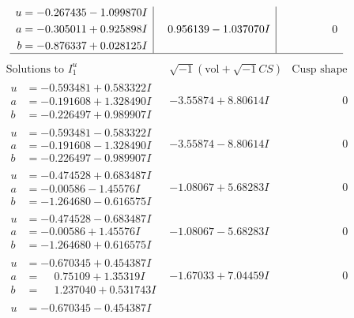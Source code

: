 \documentclass[1p]{elsarticle_modified}
\theoremstyle{definition}
\newcommand{\I}{\sqrt{-1}}
\begin{document}
$$\begin{array}{c|c|c}
\begin{aligned}
u &= -0.267435 - 1.099870 I \\
a &= -0.305011 + 0.925898 I \\
b &= -0.876337 + 0.028125 I\end{aligned}
 & \phantom{-}0.956139 - 1.037070 I & \phantom{-0.000000 } 0\\
 \hline 
 \end{array}$$\newpage$$\begin{array}{c|c|c}  
\text{Solutions to }I^u_{1}& \I (\text{vol} + \sqrt{-1}CS) & \text{Cusp shape}\\
 \hline 
\begin{aligned}
u &= -0.593481 + 0.583322 I \\
a &= -0.191608 + 1.328490 I \\
b &= -0.226497 + 0.989907 I\end{aligned}
 & -3.55874 + 8.80614 I & \phantom{-0.000000 } 0 \\ \hline\begin{aligned}
u &= -0.593481 - 0.583322 I \\
a &= -0.191608 - 1.328490 I \\
b &= -0.226497 - 0.989907 I\end{aligned}
 & -3.55874 - 8.80614 I & \phantom{-0.000000 } 0 \\ \hline\begin{aligned}
u &= -0.474528 + 0.683487 I \\
a &= -0.00586 - 1.45576 I \\
b &= -1.264680 - 0.616575 I\end{aligned}
 & -1.08067 + 5.68283 I & \phantom{-0.000000 } 0 \\ \hline\begin{aligned}
u &= -0.474528 - 0.683487 I \\
a &= -0.00586 + 1.45576 I \\
b &= -1.264680 + 0.616575 I\end{aligned}
 & -1.08067 - 5.68283 I & \phantom{-0.000000 } 0 \\ \hline\begin{aligned}
u &= -0.670345 + 0.454387 I \\
a &= \phantom{-}0.75109 + 1.35319 I \\
b &= \phantom{-}1.237040 + 0.531743 I\end{aligned}
 & -1.67033 + 7.04459 I & \phantom{-0.000000 } 0 \\ \hline\begin{aligned}
u &= -0.670345 - 0.454387 I \\

\end{aligned}
\end{array}$$
\end{document}
